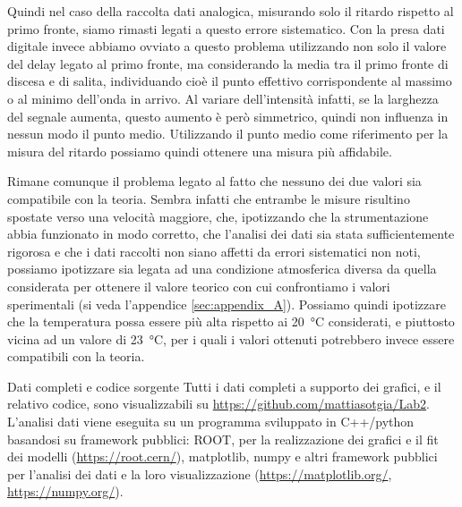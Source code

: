 \documentclass[
    rmp,
    reprint, 
    superscriptaddress, 
    altaffilletter, 
    amsmath, 
    amssymb, 
    a4paper,
    varvw]{revtex4-2}
\begin{document}
Quindi nel caso della raccolta dati analogica, misurando solo il ritardo rispetto al primo fronte, siamo rimasti legati a questo errore sistematico. Con la presa dati digitale invece abbiamo ovviato a questo problema utilizzando non solo il valore del delay legato al primo fronte, ma considerando la media tra il primo fronte di discesa e di salita, individuando cioè il punto effettivo corrispondente al massimo o al minimo dell'onda in arrivo. Al variare dell'intensità infatti, se la larghezza del segnale aumenta, questo aumento è però simmetrico, quindi non influenza in nessun modo il punto medio. Utilizzando il punto medio come riferimento per la misura del ritardo possiamo quindi ottenere una misura più affidabile. 

Rimane comunque il problema legato al fatto che nessuno dei due valori sia compatibile con la teoria. Sembra infatti che entrambe le misure risultino spostate verso una velocità maggiore, che, ipotizzando che la strumentazione abbia funzionato in modo corretto, che l'analisi dei dati sia stata sufficientemente rigorosa e che i dati raccolti non siano affetti da errori sistematici non noti, possiamo ipotizzare sia legata ad una condizione atmosferica diversa da quella considerata per ottenere il valore teorico con cui confrontiamo i valori sperimentali (si veda l'appendice \ref{sec:appendix_A}). Possiamo quindi ipotizzare che la temperatura possa essere più alta rispetto ai \SI{20}{\celsius} considerati, e piuttosto vicina ad un valore di \SI{23}{\celsius}, per i quali i valori ottenuti potrebbero invece essere compatibili con la teoria.


\begin{methods}{D\lowercase{ati completi e codice sorgente}}
    Tutti i dati completi a supporto dei grafici, e il relativo codice, sono visualizzabili su \url{https://github.com/mattiasotgia/Lab2}. L'analisi dati viene eseguita su un programma sviluppato in C++/python basandosi su framework pubblici: ROOT, per la realizzazione dei grafici e il fit dei modelli (\url{https://root.cern/}), matplotlib, numpy e altri framework pubblici per l'analisi dei dati e la loro visualizzazione (\url{https://matplotlib.org/}, \url{https://numpy.org/}).
\end{methods}

\appendix
\end{document}

